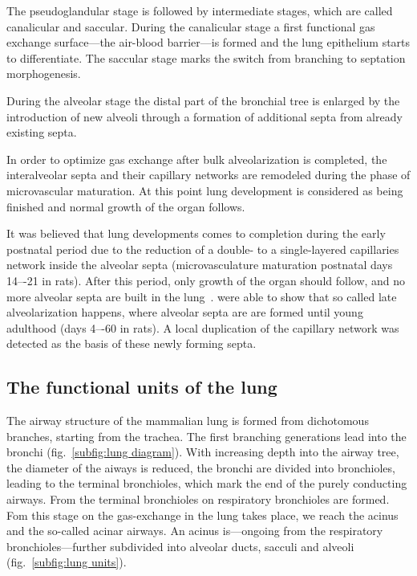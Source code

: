 The pseudoglandular stage is followed by intermediate stages, which are called canalicular and saccular. During the canalicular stage a first functional gas exchange surface---the air-blood barrier---is formed and the lung epithelium starts to differentiate. The saccular stage marks the switch from branching to septation morphogenesis.

During the alveolar stage the distal part of the bronchial tree is enlarged by the introduction of new alveoli through a formation of additional septa from already existing septa. 

In order to optimize gas exchange after bulk alveolarization is completed, the interalveolar septa and their capillary networks are remodeled during the phase of microvascular maturation. At this point lung development is considered as being finished and normal growth of the organ follows.

It was believed that lung developments comes to completion during the early postnatal period due to the reduction of a double- to a single-layered capillaries network inside the alveolar septa (microvasculature maturation postnatal days 14–-21 in rats). After this period, only growth of the organ should follow, and no more alveolar septa are built in the lung~\cite{Burri1999,Schittny2004}. \citet{Schittny2008} were able to show that so called late alveolarization happens, where alveolar septa are are formed until young adulthood (days 4–-60 in rats). A local duplication of the capillary network was detected as the basis of these newly forming septa.

\subsection{The functional units of the lung}
The airway structure of the mammalian lung is formed from dichotomous branches, starting from the trachea. The first branching generations lead into the bronchi (fig.~\ref{subfig:lung diagram}). With increasing depth into the airway tree, the diameter of the aiways is reduced, the bronchi are divided into bronchioles, leading to the terminal bronchioles, which mark the end of the purely conducting airways. From the terminal bronchioles on respiratory bronchioles are formed. Fom this stage on the gas-exchange in the lung takes place, we reach the acinus and the so-called acinar airways. An acinus is---ongoing from the respiratory bronchioles---further subdivided into alveolar ducts, sacculi and alveoli (fig.~\ref{subfig:lung units}).

